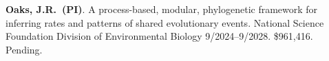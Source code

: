 \myHangIndent
\textbf{Oaks, J.R.\ (PI)}.
A process-based, modular, phylogenetic framework for inferring rates
and patterns of shared evolutionary events.
National Science Foundation Division of Environmental Biology
9/2024--9/2028.
\$961,416.
Pending.
